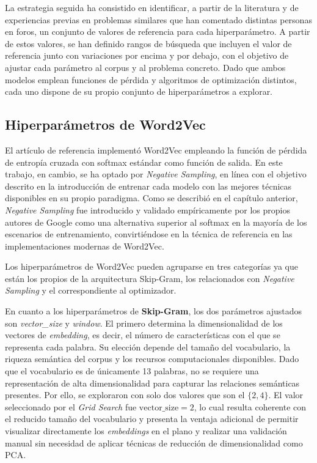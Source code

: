 La estrategia seguida ha consistido en identificar, a partir de la literatura y de experiencias previas en problemas similares que han comentado distintas personas en foros, un conjunto de valores de referencia para cada hiperparámetro. A partir de estos valores, se han definido rangos de búsqueda que incluyen el valor de referencia junto con variaciones por encima y por debajo, con el objetivo de ajustar cada parámetro al corpus y al problema concreto. Dado que ambos modelos emplean funciones de pérdida y algoritmos de optimización distintos, cada uno dispone de su propio conjunto de hiperparámetros a explorar.

\subsection{Hiperparámetros de Word2Vec}

El artículo de referencia \cite{ohno_qword2vec_2025} implementó Word2Vec empleando la función de pérdida de entropía cruzada con softmax estándar como función de salida. En este trabajo, en cambio, se ha optado por \textit{Negative Sampling}, en línea con el objetivo descrito en la introducción de entrenar cada modelo con las mejores técnicas disponibles en su propio paradigma. Como se describió en el capítulo anterior, \textit{Negative Sampling} fue introducido y validado empíricamente por los propios autores de Google \cite{mikolov_skipgram_phrases_2013} como una alternativa superior al softmax en la mayoría de los escenarios de entrenamiento, convirtiéndose en la técnica de referencia en las implementaciones modernas de Word2Vec.

Los hiperparámetros de Word2Vec pueden agruparse en tres categorías ya que están los propios de la arquitectura Skip-Gram, los relacionados con \textit{Negative Sampling} y el correspondiente al optimizador.

En cuanto a los hiperparámetros de \textbf{Skip-Gram}, los dos parámetros ajustados son \textit{vector\_size} y \textit{window}. El primero determina la dimensionalidad de los vectores de \textit{embedding}, es decir, el número de características con el que se representa cada palabra. Su elección depende del tamaño del vocabulario, la riqueza semántica del corpus y los recursos computacionales disponibles. Dado que el vocabulario es de únicamente 13 palabras, no se requiere una representación de alta dimensionalidad para capturar las relaciones semánticas presentes. Por ello, se exploraron con solo dos valores que son el $\{2, 4\}$. El valor seleccionado por el \textit{Grid Search} fue $\text{vector\_size} = 2$, lo cual resulta coherente con el reducido tamaño del vocabulario y presenta la ventaja adicional de permitir visualizar directamente los \textit{embeddings} en el plano y realizar una validación manual sin necesidad de aplicar técnicas de reducción de dimensionalidad como PCA.

